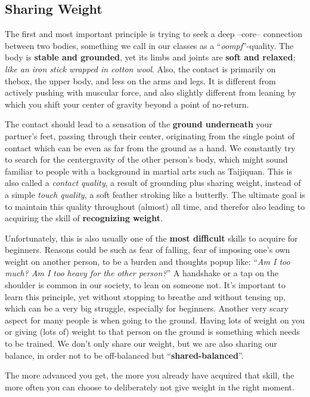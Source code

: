 \subsection{Sharing Weight}\label{subsec:sharing-weight}

The first and most important principle is trying to seek a deep --core-- connection between two bodies, something we call in our classes as a ``\textit{oompf}''-quality.
The body is \textbf{stable and grounded}, yet its limbs and joints are \textbf{soft and relaxed}; \textit{like an iron stick wrapped in cotton wool}.
Also, the contact is primarily on \gls{thebox}, the upper body, and less on the arms and legs.
It is different from actively pushing with muscular force, and also slightly different from leaning by which you shift your center of gravity beyond a point of no-return.

The contact should lead to a sensation of the \textbf{ground underneath} your partner's feet, passing through their center, originating from the single point of contact which can be even as far from the ground as a hand.
We constantly try to search for the \gls{centergravity} of the other person's body, which might sound familiar to people with a background in martial arts such as Taijiquan.
This is also called a \textit{contact quality}, a result of grounding plus sharing weight, instead of a simple \textit{touch quality}, a soft feather stroking like a butterfly.
The ultimate goal is to maintain this quality throughout (almost) all time, and therefor also leading to acquiring the skill of \textbf{recognizing weight}.

Unfortunately, this is also usually one of the \textbf{most difficult} skills to acquire for beginners.
Reasons could be such as fear of falling, fear of imposing one's own weight on another person, to be a burden and thoughts popup like: ``\textit{Am I too much? Am I too heavy for the other person?}''
A handshake or a tap on the shoulder is common in our society, to lean on someone not.
It's important to learn this principle, yet without stopping to breathe and without tensing up, which can be a very big struggle, especially for beginners.
Another very scary aspect for many people is when going to the ground.
Having lots of weight on you or giving (lots of) weight to that person on the ground is something which needs to be trained.
We don't only share our weight, but we are also sharing our balance, in order not to be off-balanced but ``\textbf{shared-balanced}''.

The more advanced you get, the more you already have acquired that skill, the more often you can choose to deliberately not give weight in the right moment.


